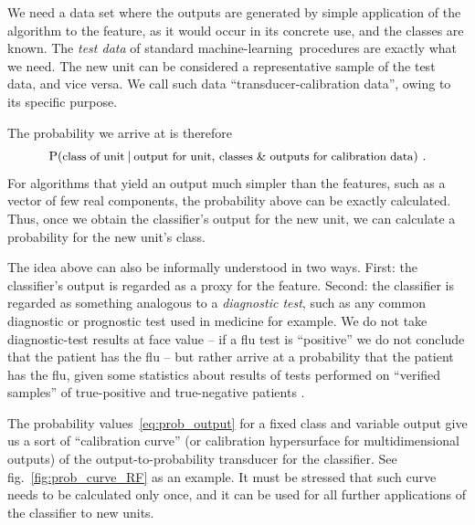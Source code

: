 \documentclass[\ifafour a4paper,12pt,\else a5paper,10pt,\fi%
onecolumn,oneside,article,%
british%
]{memoir}
\theoremstyle{remark}
\theoremstyle{innote}
\newcommand*{\amp}{\&}
\renewcommand*{\P}{\mathrm{P}}%
\renewcommand*{\|}[1][]{\nonscript\:#1\vert\nonscript\:\mathopen{}}
\newcommand*{\chap}{ch.}%
\newcommand*{\fig}{fig.}%
\newcommand*{\texts}[1]{\text{\small #1}}
\newcommand*{\ml}{machine-learning}
\begin{document}
We need a data set where the outputs are generated by simple application of the algorithm to the feature, as it would occur in its concrete use, and the classes are known. The \emph{test data} of standard \ml\ procedures are exactly what we need. The new unit can be considered a representative sample of the test data, and vice versa. We call such data \enquote{transducer-calibration data}, owing to its specific purpose.

The probability we arrive at is therefore
\begin{equation}
  \label{eq:prob_output}
  \P(\texts{class of unit} \| \texts{output for unit},\,
  \texts{classes \amp\ outputs for calibration data}) \ .
\end{equation}
For algorithms that yield an output much simpler than the features, such as a vector of few real components, the probability above can be exactly calculated. Thus, once we obtain the classifier's output for the new unit, we can calculate a probability for the new unit's class.

\medskip

The idea above can also be informally understood in two ways. First: the classifier's output is regarded as a proxy for the feature. Second: the classifier is regarded as something analogous to a \emph{diagnostic test}, such as any common diagnostic or prognostic test used in medicine for example. We do not take diagnostic-test results at face value -- if a flu test is \enquote{positive} we do not conclude that the patient has the flu -- but rather arrive at a probability that the patient has the flu, given some statistics about results of tests performed on \enquote{verified samples} of true-positive and true-negative patients \autocites[\chap~5]{soxetal1988_r2013}[\chap~5]{huninketal2001_r2014}[see also][]{jennyetal2018}.

The probability values~\eqref{eq:prob_output} for a fixed class and variable output give us a sort of \enquote{calibration curve} (or calibration hypersurface for multidimensional outputs) of the output-to-probability transducer for the classifier. See \fig~\ref{fig:prob_curve_RF} as an example. It must be stressed that such curve needs to be calculated only once, and it can be used for all further applications of the classifier to new units.

\medskip
\end{document}
